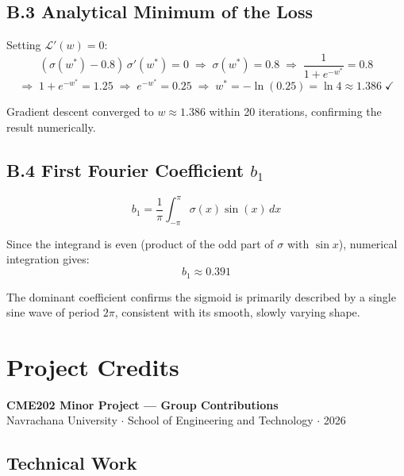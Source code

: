 \documentclass[12pt,a4paper]{article}
\begin{document}
\subsection*{B.3 Analytical Minimum of the Loss}

Setting $\mathcal{L}'(w) = 0$:
\[
  (\sigma(w^*) - 0.8)\,\sigma'(w^*) = 0
  \;\Rightarrow\; \sigma(w^*) = 0.8
  \;\Rightarrow\; \frac{1}{1+e^{-w^*}} = 0.8
\]
\[
  \Rightarrow\; 1 + e^{-w^*} = 1.25
  \;\Rightarrow\; e^{-w^*} = 0.25
  \;\Rightarrow\; w^* = -\ln(0.25) = \ln 4 \approx 1.386 \;\checkmark
\]

Gradient descent converged to $w \approx 1.386$ within 20 iterations, confirming the result numerically.

\subsection*{B.4 First Fourier Coefficient $b_1$}

\[
  b_1 = \frac{1}{\pi}\int_{-\pi}^{\pi} \sigma(x)\sin(x)\,dx
\]

Since the integrand is even (product of the odd part of $\sigma$ with $\sin x$), numerical integration gives:
\[
  \boxed{b_1 \approx 0.391}
\]

The dominant coefficient confirms the sigmoid is primarily described by a single sine wave of period $2\pi$, consistent with its smooth, slowly varying shape.

\newpage

\section*{Project Credits}

\begin{center}
  {\large\bfseries\color{navrachana} CME202 Minor Project --- Group Contributions}\\[0.4cm]
  {\small\color{gray} Navrachana University $\cdot$ School of Engineering and Technology $\cdot$ 2026}
\end{center}

\vspace{0.5cm}

\subsection*{Technical Work}
\end{document}
